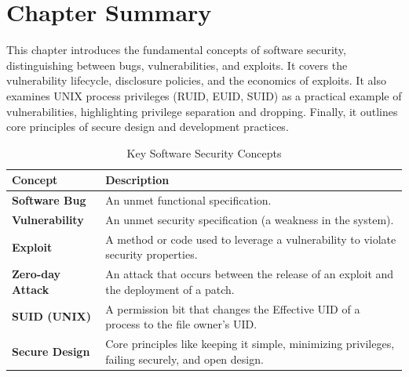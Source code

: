 \section*{Chapter Summary}
This chapter introduces the fundamental concepts of software security, distinguishing between bugs, vulnerabilities, and exploits. It covers the vulnerability lifecycle, disclosure policies, and the economics of exploits. It also examines UNIX process privileges (RUID, EUID, SUID) as a practical example of vulnerabilities, highlighting privilege separation and dropping. Finally, it outlines core principles of secure design and development practices.

\begin{table}[hbtp]
\centering
\begin{tabular}{|l|p{10cm}|}
\hline
\textbf{Concept} & \textbf{Description} \\
\hline
\textbf{Software Bug} & An unmet functional specification. \\
\hline
\textbf{Vulnerability} & An unmet security specification (a weakness in the system). \\
\hline
\textbf{Exploit} & A method or code used to leverage a vulnerability to violate security properties. \\
\hline
\textbf{Zero-day Attack} & An attack that occurs between the release of an exploit and the deployment of a patch. \\
\hline
\textbf{SUID (UNIX)} & A permission bit that changes the Effective UID of a process to the file owner's UID. \\
\hline
\textbf{Secure Design} & Core principles like keeping it simple, minimizing privileges, failing securely, and open design. \\
\hline
\end{tabular}
\caption{Key Software Security Concepts}
\end{table}
